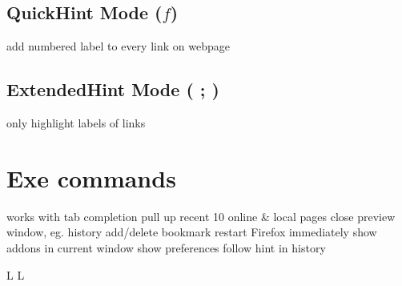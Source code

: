 \subsection{QuickHint Mode ($f$)}{add numbered label to every link on webpage}
\subsection{ExtendedHint Mode ( ; )}{only highlight labels of links}

\section{Exe commands}{works with tab completion}
	{pull up recent 10 online \& local pages}
	{close preview window, eg. history}
	{add/delete bookmark}
	{restart Firefox immediately}
	{show addons in current window}
	{show preferences}
	{follow hint in history}

\copyrightnotice

\vfil
\supereject
\if L\lr \else\null\vfill\eject\fi
\if L\lr \else\null\vfill\eject\fi
\bye

